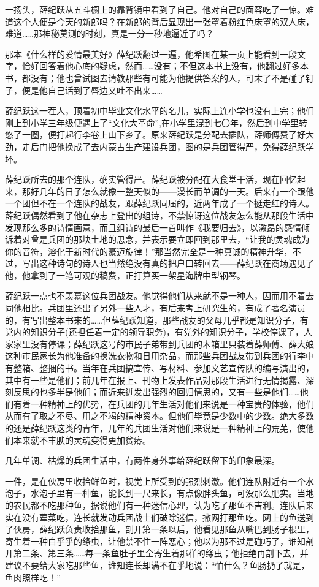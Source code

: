 \par 一扬头，薛纪跃从五斗橱上的靠背镜中看到了自己。他对自己的面容吃了一惊。难道这个人便是今天的新郎吗？在新郎的背后显现出一张罩着粉红色床罩的双人床，难道……那神秘莫测的时刻，真是一分一秒地逼近了吗？
\par 那本《什么样的爱情最美好》薛纪跃翻过一遍，他希图在某一页上能看到一段文字，恰好回答着他心底的疑虑，然而……没有；不但这本书上没有，他翻过好多本书，都没有；他也曾试图去请教那些有可能为他提供答案的人，可末了不是碰了钉子，便是他自己话到了唇边又吐不出来……
\par 薛纪跃这一茬人，顶着初中毕业文化水平的名儿，实际上连小学也没有上完；他们刚上到小学三年级便遇上了“文化大革命”,在小学里混到七〇年，然后到中学里转悠了一圈，便打起行李卷上山下乡了。原来薛纪跃是分配去插队，薛师傅费了好大劲，走后门把他换成了去内蒙古生产建设兵团，图的是兵团管得严，免得薛纪跃学坏。
\par 薛纪跃所去的那个连队，确实管得严。薛纪跃被分配在大食堂干活，现在回忆起来，那好几年的日子怎么就像一整天似的——漫长而单调的一天。后来有一个跟他一个团但不在一个连队的战友，跟薛纪跃同届的，近两年成了一个挺走红的诗人。薛纪跃偶然看到了他在杂志上登出的组诗，不禁惊讶这位战友怎么能从那段生活中发现那么多的诗情画意，而且组诗的最后一首叫作《我要归去》，以激昂的感情倾诉着对曾是兵团的那块土地的思念，并表示要立即回到那里去，“让我的灵魂成为你的音符，溶化于新时代的豪迈旋律！”那当然完全是一种真诚的精神升华，不过，写出这种诗句的诗人也当然绝没有真的把户口转回去——薛纪跃在商场遇见了他，他拿到了一笔可观的稿费，正打算买一架星海牌中型钢琴。
\par 薛纪跃一点也不羡慕这位兵团战友。他觉得他们从来就不是一种人，因而用不着去同他相比。兵团里还出了另外一些人才，有后来考上研究生的，有成了著名演员的，有写出整本书来的……但薛纪跃知道，那些战友的父母几乎都是知识分子，有党内的知识分子(还担任着一定的领导职务)，有党外的知识分子，学校停课了，人家家里没有停课；薛纪跃这号的市民子弟带到兵团的木箱里只装着薛师傅、薛大娘这种市民家长为他准备的换洗衣物和日用杂品，而那些兵团战友带到兵团的行李中有整箱、整捆的书。当年在兵团搞宣传、写材料、参加文艺宣传队的编写演出的，其中有一些是他们；前几年在报上、刊物上发表作品对那段生活进行无情揭露、深刻反思的也多半是他们；而近来迸发出强烈的回归情思的，又有一些是他们……他们有着一种精神上的优势，在兵团的几年生活对他们来说是一种宝贵的体验，他们从而有了取之不尽、用之不竭的精神资本。但他们毕竟是少数中的少数。绝大多数的还是薛纪跃这类的青年，几年的兵团生活对他们来说是一种精神上的荒芜，使他们本来就不丰腴的灵魂变得更加贫瘠。
\par 几年单调、枯燥的兵团生活中，有两件身外事给薛纪跃留下的印象最深。
\par 一件，是在伙房里收拾鲜鱼时，视觉上所受到的强烈刺激。他们连队附近有一个水泡子，水泡子里有一种鱼，能长到一尺来长，有点像胖头鱼，可没那么肥实。当地的农民都不吃那种鱼，据说他们有一种迷信心理，认为吃了那鱼不吉利。连队后来实在没有荤菜吃，连长就发动兵团战士们破除迷信，撒网打那鱼吃。网上的鱼送到了伙房，薛纪跃负责收拾那鱼，剖开第一条以后，他看见那鱼从嘴巴到肠子根里，寄生着一种白乎乎的绦虫，让他禁不住一阵恶心；他以为那不过是碰巧了，谁知剖开第二条、第三条……每一条鱼肚子里全寄生着那样的绦虫；他拒绝再剖下去，并建议不要给大家吃那些鱼，谁知连长却满不在乎地说：“怕什么？鱼肠扔了就是，鱼肉照样吃！”
